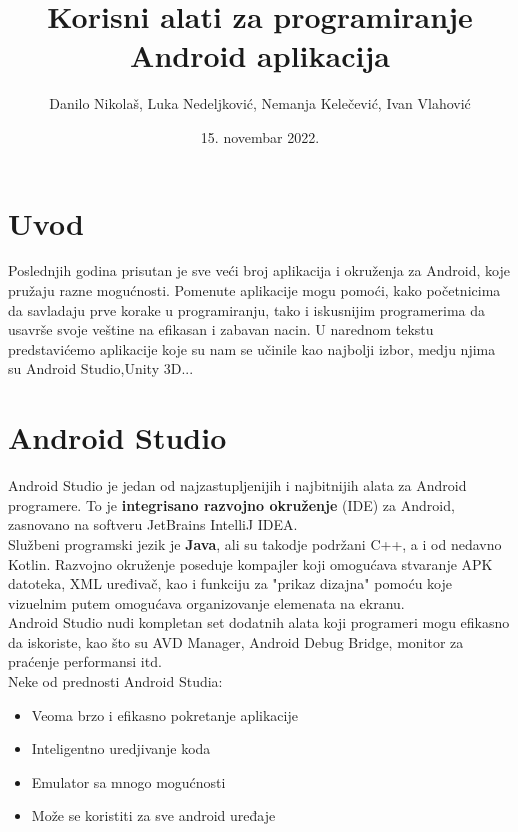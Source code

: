 \documentclass[12pt]{article}
\title{Korisni alati za programiranje Android aplikacija}
\author{Danilo Nikolaš, Luka Nedeljković, Nemanja Kelečević, Ivan Vlahović}
\date{15. novembar 2022.}
\begin{document}
\maketitle
\tableofcontents
\pagebreak

\section{Uvod}
Poslednjih godina prisutan je sve veći broj aplikacija i okruženja za Android, koje pružaju razne mogućnosti.
Pomenute aplikacije mogu pomoći, kako početnicima da savladaju prve korake u programiranju, tako i iskusnijim programerima da usavrše svoje veštine na efikasan i zabavan nacin.
U narednom tekstu predstavićemo aplikacije koje su nam se učinile kao najbolji izbor, medju njima su Android Studio,Unity 3D... \

\section{Android Studio}
Android Studio je jedan od najzastupljenijih i najbitnijih alata za Android programere. To je \textbf{integrisano razvojno okruženje} (IDE) za Android, zasnovano na softveru JetBrains IntelliJ IDEA.  \\
\hspace*{0.7cm}Službeni programski jezik je \textbf{Java}, ali su takodje podržani C++, a i od nedavno Kotlin. Razvojno okruženje poseduje kompajler koji omogućava stvaranje APK datoteka, XML uređivač, kao i funkciju za "prikaz dizajna" pomoću koje vizuelnim putem omogućava organizovanje elemenata na ekranu. \\
\hspace*{0.7cm}Android Studio nudi kompletan set dodatnih alata koji programeri mogu efikasno da iskoriste, kao što su AVD Manager, Android Debug Bridge, monitor za praćenje performansi itd.\\
Neke od prednosti Android Studia:
\begin{itemize}
\item{Veoma brzo i efikasno pokretanje aplikacije}
\item{Inteligentno uredjivanje koda} 
\item{Emulator sa mnogo mogućnosti}
\item{Može se koristiti za sve android uređaje}
\end{itemize}
\end{document}
